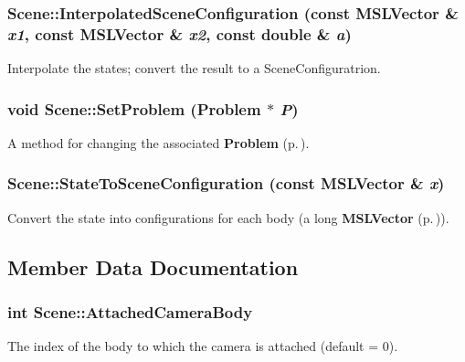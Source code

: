 \subsubsection{ Scene::Interpolated\-Scene\-Configuration (const {\bf MSLVector} \& {\em x1}, const {\bf MSLVector} \& {\em x2}, const double \& {\em a})\hspace{0.3cm}{\tt  [virtual]}}\label{class_Scene_a4}


Interpolate the states; convert the result to a Scene\-Configuratrion.

\subsubsection{\setlength{\rightskip}{0pt plus 5cm}void Scene::Set\-Problem ({\bf Problem} $\ast$ {\em P})}\label{class_Scene_a2}


A method for changing the associated {\bf Problem} {\rm (p.\,\pageref{class_Problem})}.

\subsubsection{ Scene::State\-To\-Scene\-Configuration (const {\bf MSLVector} \& {\em x})\hspace{0.3cm}{\tt  [virtual]}}\label{class_Scene_a3}


Convert the state into configurations for each body (a long {\bf MSLVector} {\rm (p.\,\pageref{class_MSLVector})}).



\subsection{Member Data Documentation}
\subsubsection{\setlength{\rightskip}{0pt plus 5cm}int Scene::Attached\-Camera\-Body}\label{class_Scene_m12}


The index of the body to which the camera is attached (default = 0).

